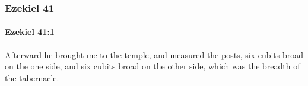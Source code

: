 	\subsubsection{Ezekiel 41} %
		\label{EZEKIEL-41}

		\paragraph{Ezekiel 41:1} %
			\label{EZEKIEL-41-1}

			Afterward he brought me to the temple, and measured the posts, six cubits broad on the one side, and six cubits broad on the other side, which was the breadth of the tabernacle.


